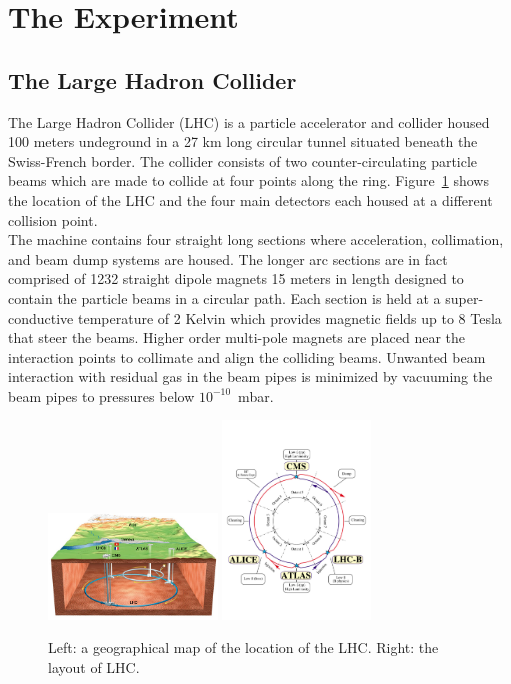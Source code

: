 \clearpage
\section{The Experiment}

\subsection{The Large Hadron Collider\label{sec:lhc}}

The Large Hadron Collider (LHC) is a particle accelerator and collider
housed 100 meters undeground in a 27 km long circular tunnel situated 
beneath the Swiss-French border. The collider consists of two 
counter-circulating particle beams which are made to collide at four points 
along the ring. Figure~\ref{fig:lhc} shows the location of the LHC and 
the four main detectors each housed at a different collision point.\\
\indent The machine contains four straight long sections where acceleration, 
collimation, and beam dump systems are housed. The longer arc sections are
in fact comprised of 1232 straight dipole magnets 15 meters in length designed to contain 
the particle beams in a circular path. Each section is held at a 
super-conductive temperature of 2 Kelvin which provides magnetic fields up to 8
Tesla that steer the beams. Higher order multi-pole magnets are 
placed near the interaction points to collimate and align the 
colliding beams. Unwanted beam interaction with residual gas in the beam pipes
is minimized by vacuuming the beam pipes to pressures below $10^{-10}$~mbar.

\begin{figure}[h!]
  \begin{center}
      \includegraphics[width=0.40\textwidth,]{figures/CERNMap.jpg}
      \includegraphics[width=0.35\textwidth,]{figures/lhc-pho-1997-060.jpg}
      \caption{\label{fig:lhc} Left: a geographical map of the location of the LHC. Right: 
      the layout of LHC.}
  \end{center}
\end{figure}

